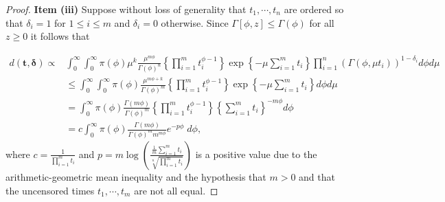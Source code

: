 \documentclass[12pt]{article} %
\theoremstyle{plain}%
\theoremstyle{definition}
\theoremstyle{remark}
\begin{document}
\begin{proof}
\vspace{0.3cm}
\noindent \textbf{Item (iii)} Suppose without loss of generality that $t_1,\cdots,t_n$ are ordered so that $\delta_i=1$ for $1\leq i\leq m$ and $\delta_i=0$ otherwise. Since $\Gamma[\phi,z]\leq \Gamma(\phi)$ for all $z\geq 0$ it follows that


\begin{align*}
d(\boldsymbol{t,\delta})\propto &\int_{0}^{\infty}\int_{0}^{\infty}\pi(\phi)\mu^k\frac{\mu^{m\phi}}{\Gamma(\phi)^n}\left\{\prod_{i=1}^m{t_i^{\phi-1}}\right\}\exp\left\{-\mu\sum_{i=1}^m t_i\right\}\prod_{i=1}^n\left(\Gamma(\phi,\mu t_i)\right)^{1-\delta_i}d\phi d\mu \nonumber\\
&\leq \int_{0}^{\infty}\int_{0}^{\infty}\pi(\phi)\frac{\mu^{m\phi+k}}{\Gamma(\phi)^m}\left\{\prod_{i=1}^m{t_i^{\phi-1}}\right\}\exp\left\{-\mu\sum_{i=1}^m t_i\right\}d\phi d\mu \nonumber\\
&= \int_{0}^{\infty}\pi(\phi)\frac{\Gamma(m\phi)}{\Gamma(\phi)^m}\left\{\prod_{i=1}^m{t_i^{\phi-1}}\right\}\left\{\sum_{i=1}^m t_i\right\}^{-m\phi} d\phi \nonumber \\
&= c \int_{0}^{\infty}\pi(\phi)\frac{\Gamma(m\phi)}{\Gamma(\phi)^m m^{m \phi}}e^{-p\phi}\; d\phi,
\end{align*}
where $c = \frac{1}{\prod_{i=1}^m t_i}$ 
and $p = m \log\left(\frac{\frac{1}{m}\sum_{i=1}^m t_i}{\sqrt[n]{\prod_{i=1}^m t_i}}\right)$ is a positive value due to the arithmetic-geometric mean inequality and the hypothesis that $m>0$ and that the uncensored times $t_1,\cdots,t_m$ are not all equal.


\end{proof}
\end{document}
